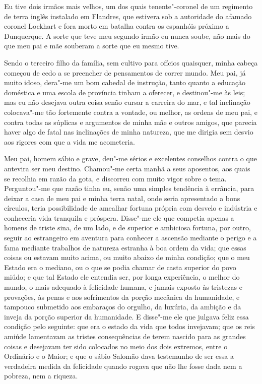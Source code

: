 Eu tive dois irmãos mais velhos, um dos quais tenente"-coronel de um
regimento de terra inglês instalado em Flandres, que estivera sob a
autoridade do afamado coronel Lockhart e fora morto em batalha contra os
espanhóis próximo a Dunquerque. A sorte que teve meu segundo irmão eu
nunca soube, não mais do que meu pai e mãe souberam a sorte que eu mesmo
tive.

Sendo o terceiro filho da família, sem cultivo para ofícios quaisquer,
minha cabeça começou de cedo a se preencher de pensamentos de correr
mundo. Meu pai, já muito idoso, dera"-me um bom cabedal de instrução,
tanto quanto a educação doméstica e uma escola de província tinham a
oferecer, e destinou"-me às leis; mas eu não desejava outra coisa senão
cursar a carreira do mar, e tal inclinação colocava"-me tão fortemente
contra a vontade, ou melhor, as ordens de meu pai, e contra todas as
súplicas e argumentos de minha mãe e outros amigos, que parecia haver
algo de fatal nas inclinações de minha natureza, que me dirigia sem
desvio aos rigores com que a vida me acometeria.

Meu pai, homem sábio e grave, deu"-me sérios e excelentes conselhos
contra o que antevira ser meu destino. Chamou"-me certa manhã a seus
aposentos, aos quais se recolhia em razão da gota, e discorreu com muito
vigor sobre o tema. Perguntou"-me que razão tinha eu, senão uma simples
tendência à errância, para deixar a casa de meu pai e minha terra natal,
onde seria apresentado a bons círculos, teria possibilidade de amealhar
fortuna própria com desvelo e indústria e conheceria vida tranquila e
próspera. Disse"-me ele que competia apenas a homens de triste sina, de
um lado, e de superior e ambiciosa fortuna, por outro, seguir ao
estrangeiro em aventura para conhecer a ascensão mediante o perigo e a
fama mediante trabalhos de natureza estranha à boa ordem da vida; que
essas coisas ou estavam muito acima, ou muito abaixo de minha condição;
que o meu Estado era o mediano, ou o que se podia chamar de casta
superior do povo miúdo; e que tal Estado ele entendia ser, por longa
experiência, o melhor do mundo, o mais adequado à felicidade humana, e
jamais exposto às tristezas e provações, às penas e aos sofrimentos da
porção mecânica da humanidade, e tampouco submetido aos embaraços do
orgulho, da luxúria, da ambição e da inveja da porção superior da
humanidade. E disse"-me ele que julgava feliz essa condição pelo
seguinte: que era o estado da vida que todos invejavam; que os reis
amiúde lamentavam as tristes consequências de terem nascido para as
grandes coisas e desejavam ter sido colocados no meio dos dois extremos,
entre o Ordinário e o Maior; e que o sábio Salomão dava testemunho de
ser essa a verdadeira medida da felicidade quando rogava que não lhe
fosse dada nem a pobreza, nem a riqueza.

